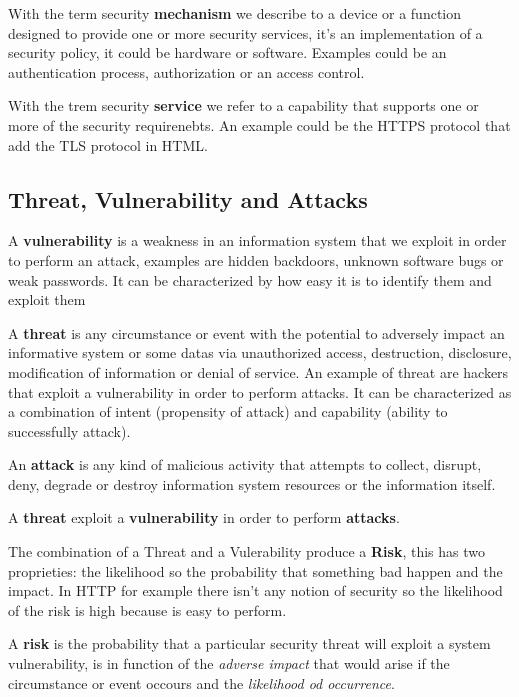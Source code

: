     With the term security \textbf{mechanism} we describe to a device or a function designed to provide one or more security services, it's an implementation of a security policy, it could be hardware or software. Examples could be an authentication process, authorization or an access control.
    
    With the trem security \textbf{service} we refer to a capability that supports one or more of the security requirenebts. An example could be the HTTPS protocol that add the TLS protocol in HTML.
    
    \subsection{Threat, Vulnerability and Attacks}
    A \textbf{vulnerability} is a weakness in an information system that we exploit in order to perform an attack, examples are hidden backdoors, unknown software bugs or weak passwords. It can be characterized by how easy it is to identify them and exploit them
    
    A \textbf{threat} is any circumstance or event with the potential to adversely impact an informative system or some datas via unauthorized access, destruction, disclosure, modification of information or denial of service. An example of threat are hackers that exploit a vulnerability in order to perform attacks. It can be characterized as a combination of intent (propensity of attack) and capability (ability to successfully attack).
    
    An \textbf{attack} is any kind of malicious activity that attempts to collect, disrupt, deny, degrade or destroy information system resources or the information itself.
    
    A \textbf{threat} exploit a \textbf{vulnerability} in order to perform \textbf{attacks}.
    
    The combination of a Threat and a Vulerability produce a \textbf{Risk}, this has two proprieties: the likelihood so the probability that something bad happen and the impact. In HTTP for example there isn't any notion of security so the likelihood of the risk is high because is easy to perform.
    
    A \textbf{risk} is the probability that a particular security threat will exploit a system vulnerability, is in function of the \textit{adverse impact} that would arise if the circumstance or event occours and the \textit{likelihood od occurrence}.
    
